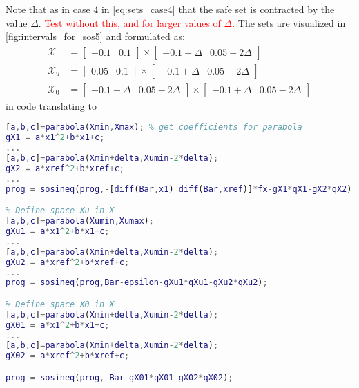Note that as in case 4 in \autoref{eq:sets_case4} that the safe set is contracted by the value $\Delta$. \textcolor{red}{Test without this, and for larger values of $\Delta$.}
The sets are visualized in \autoref{fig:intervals_for_sos5} and formulated as:
\begin{subequations}\label{eq:sets_case5}
\begin{align}
	\mathcal{X} &= \begin{bmatrix} -0.1 & 0.1\end{bmatrix} \times \begin{bmatrix} -0.1+\Delta & 0.05-2\Delta\end{bmatrix}\\
	\mathcal{X}_u &= \begin{bmatrix} 0.05 & 0.1\end{bmatrix} \times \begin{bmatrix} -0.1+\Delta & 0.05-2\Delta\end{bmatrix}\\
	\mathcal{X}_0 &= \begin{bmatrix} -0.1+\Delta & 0.05-2\Delta\end{bmatrix} \times \begin{bmatrix} -0.1+\Delta & 0.05-2\Delta\end{bmatrix}
\end{align}
\end{subequations}
in code translating to
\begin{lstlisting}[language=matlab]
% Define space X in Rn
[a,b,c]=parabola(Xmin,Xmax); % get coefficients for parabola
gX1 = a*x1^2+b*x1+c;
...
[a,b,c]=parabola(Xmin+delta,Xumin-2*delta);
gX2 = a*xref^2+b*xref+c;
...
prog = sosineq(prog,-[diff(Bar,x1) diff(Bar,xref)]*fx-gX1*qX1-gX2*qX2);

% Define space Xu in X
[a,b,c]=parabola(Xumin,Xumax);
gXu1 = a*x1^2+b*x1+c;
...
[a,b,c]=parabola(Xmin+delta,Xumin-2*delta);
gXu2 = a*xref^2+b*xref+c;
...
prog = sosineq(prog,Bar-epsilon-gXu1*qXu1-gXu2*qXu2);

% Define space X0 in X
[a,b,c]=parabola(Xmin+delta,Xumin-2*delta);
gX01 = a*x1^2+b*x1+c;
...
[a,b,c]=parabola(Xmin+delta,Xumin-2*delta);
gX02 = a*xref^2+b*xref+c;

prog = sosineq(prog,-Bar-gX01*qX01-gX02*qX02);
\end{lstlisting}

